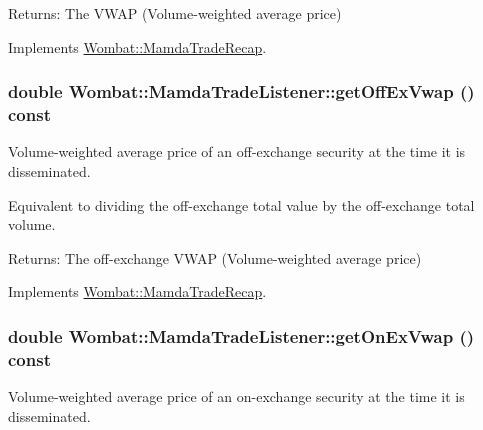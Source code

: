 \begin{Desc}
\item[Returns:]The VWAP (Volume-weighted average price) \end{Desc}


Implements \hyperlink{classWombat_1_1MamdaTradeRecap_b80bace23fde9c5712351bc6a9f2344b}{Wombat::Mamda\-Trade\-Recap}.\hypertarget{classWombat_1_1MamdaTradeListener_a7d5a2f66aa6979d4ebd2e8d72621008}{
\subsubsection[getOffExVwap]{\setlength{\rightskip}{0pt plus 5cm}double Wombat::Mamda\-Trade\-Listener::get\-Off\-Ex\-Vwap () const}}
\label{classWombat_1_1MamdaTradeListener_a7d5a2f66aa6979d4ebd2e8d72621008}


Volume-weighted average price of an off-exchange security at the time it is disseminated. 

Equivalent to dividing the off-exchange total value by the off-exchange total volume.

\begin{Desc}
\item[Returns:]The off-exchange VWAP (Volume-weighted average price) \end{Desc}


Implements \hyperlink{classWombat_1_1MamdaTradeRecap_9c9488d1b62675928ec13e2f8d9fdd53}{Wombat::Mamda\-Trade\-Recap}.\hypertarget{classWombat_1_1MamdaTradeListener_e0e6940f05e4ba0c6f60c46990d6dbd1}{
\subsubsection[getOnExVwap]{\setlength{\rightskip}{0pt plus 5cm}double Wombat::Mamda\-Trade\-Listener::get\-On\-Ex\-Vwap () const}}
\label{classWombat_1_1MamdaTradeListener_e0e6940f05e4ba0c6f60c46990d6dbd1}


Volume-weighted average price of an on-exchange security at the time it is disseminated. 

